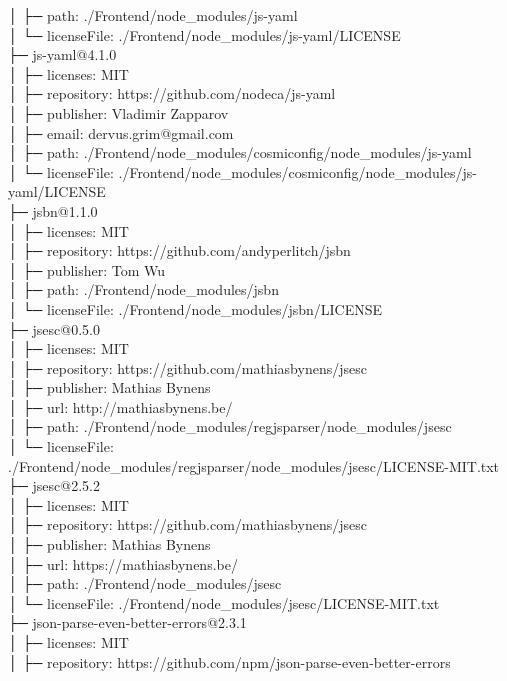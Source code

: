 │  ├─ path: ./Frontend/node\_modules/js-yaml\\
│  └─ licenseFile: ./Frontend/node\_modules/js-yaml/LICENSE\\
├─ js-yaml@4.1.0\\
│  ├─ licenses: MIT\\
│  ├─ repository: https://github.com/nodeca/js-yaml\\
│  ├─ publisher: Vladimir Zapparov\\
│  ├─ email: dervus.grim@gmail.com\\
│  ├─ path: ./Frontend/node\_modules/cosmiconfig/node\_modules/js-yaml\\
│  └─ licenseFile: ./Frontend/node\_modules/cosmiconfig/node\_modules/js-yaml/LICENSE\\
├─ jsbn@1.1.0\\
│  ├─ licenses: MIT\\
│  ├─ repository: https://github.com/andyperlitch/jsbn\\
│  ├─ publisher: Tom Wu\\
│  ├─ path: ./Frontend/node\_modules/jsbn\\
│  └─ licenseFile: ./Frontend/node\_modules/jsbn/LICENSE\\
├─ jsesc@0.5.0\\
│  ├─ licenses: MIT\\
│  ├─ repository: https://github.com/mathiasbynens/jsesc\\
│  ├─ publisher: Mathias Bynens\\
│  ├─ url: http://mathiasbynens.be/\\
│  ├─ path: ./Frontend/node\_modules/regjsparser/node\_modules/jsesc\\
│  └─ licenseFile: ./Frontend/node\_modules/regjsparser/node\_modules/jsesc/LICENSE-MIT.txt\\
├─ jsesc@2.5.2\\
│  ├─ licenses: MIT\\
│  ├─ repository: https://github.com/mathiasbynens/jsesc\\
│  ├─ publisher: Mathias Bynens\\
│  ├─ url: https://mathiasbynens.be/\\
│  ├─ path: ./Frontend/node\_modules/jsesc\\
│  └─ licenseFile: ./Frontend/node\_modules/jsesc/LICENSE-MIT.txt\\
├─ json-parse-even-better-errors@2.3.1\\
│  ├─ licenses: MIT\\
│  ├─ repository: https://github.com/npm/json-parse-even-better-errors\\
